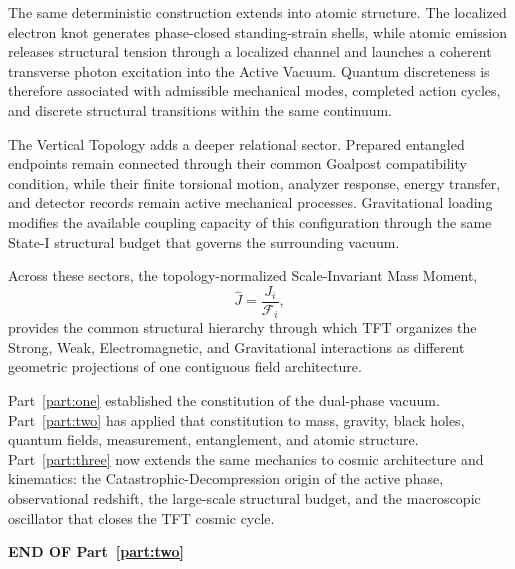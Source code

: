 The same deterministic construction extends into atomic structure. The localized electron knot generates phase-closed standing-strain shells, while atomic emission releases structural tension through a localized channel and launches a coherent transverse photon excitation into the Active Vacuum. Quantum discreteness is therefore associated with admissible mechanical modes, completed action cycles, and discrete structural transitions within the same continuum.

The Vertical Topology adds a deeper relational sector. Prepared entangled endpoints remain connected through their common Goalpost compatibility condition, while their finite torsional motion, analyzer response, energy transfer, and detector records remain active mechanical processes. Gravitational loading modifies the available coupling capacity of this configuration through the same State-I structural budget that governs the surrounding vacuum.

Across these sectors, the topology-normalized Scale-Invariant Mass Moment,
\begin{equation}
    \hat J
    =
    \frac{J_i}{\mathcal F_i},
\end{equation}
provides the common structural hierarchy through which TFT organizes the Strong, Weak, Electromagnetic, and Gravitational interactions as different geometric projections of one contiguous field architecture.

Part~\ref{part:one} established the constitution of the dual-phase vacuum. Part~\ref{part:two} has applied that constitution to mass, gravity, black holes, quantum fields, measurement, entanglement, and atomic structure. Part~\ref{part:three} now extends the same mechanics to cosmic architecture and kinematics: the Catastrophic-Decompression origin of the active phase, observational redshift, the large-scale structural budget, and the macroscopic oscillator that closes the TFT cosmic cycle.

\vspace{2cm}

\begin{center}
    \textbf{\Large END OF Part~\ref{part:two}}
\end{center}
